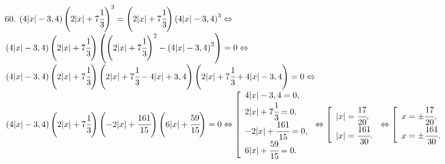 60. $\left(4|x|-3,4\right)\left(2|x|+7\cfrac{1}{3}\right)^3=\left(2|x|+7\cfrac{1}{3}\right)\left(4|x|-3,4\right)^3\Leftrightarrow$\\$
\left(4|x|-3,4\right)\left(2|x|+7\cfrac{1}{3}\right)\left(\left(2|x|+7\cfrac{1}{3}\right)^2-\left(4|x|-3,4\right)^2\right)=0\Leftrightarrow$\\$
\left(4|x|-3,4\right)\left(2|x|+7\cfrac{1}{3}\right)\left(2|x|+7\cfrac{1}{3}-4|x|+3,4\right)\left(2|x|+7\cfrac{1}{3}+4|x|-3,4\right)=0\Leftrightarrow$\\
$\left(4|x|-3,4\right)\left(2|x|+7\cfrac{1}{3}\right)\left(-2|x|+\cfrac{161}{15}\right)\left(6|x|+\cfrac{59}{15}\right)=0\Leftrightarrow
\left[\begin{array}{l}
4|x|-3,4=0,\\
2|x|+7\cfrac{1}{3}=0,\\
-2|x|+\cfrac{161}{15}=0,\\
6|x|+\cfrac{59}{15}=0.\end{array}\right.\Leftrightarrow \left[\begin{array}{l}
|x|=\cfrac{17}{20},\\
|x|=\cfrac{161}{30}.\end{array}\right.\Leftrightarrow \left[\begin{array}{l}
x=\pm\cfrac{17}{20},\\
x=\pm\cfrac{161}{30}.\end{array}\right.$\\
